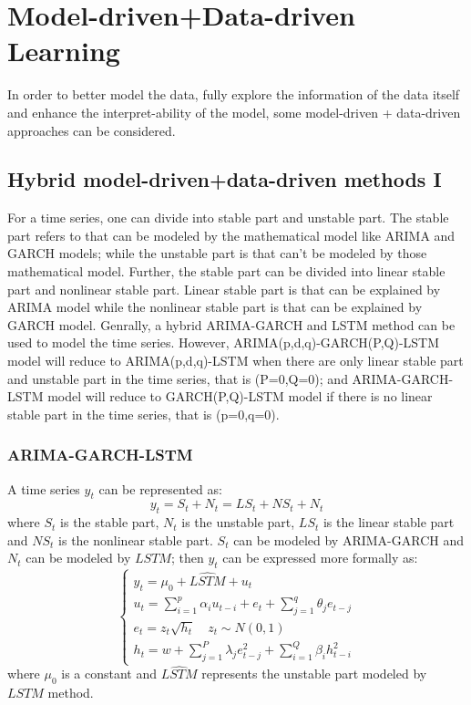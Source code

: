 \section{Model-driven+Data-driven Learning}
\vspace{-0.10in}
In order to better model the data, fully explore the information of the data itself and enhance the interpret-ability of the model, some model-driven + data-driven approaches can be considered.
\subsection{Hybrid model-driven+data-driven methods I}
\vspace{-0.10in}
For a time series, one can divide into stable part and unstable part. The stable part refers to that can be modeled by the mathematical model like ARIMA and GARCH models; while the unstable part is that can't be modeled by those mathematical model. Further, the stable part can be divided into linear stable part and nonlinear stable part. Linear stable part is that can be explained by ARIMA model while the nonlinear stable part is that can be explained by GARCH model. Genrally, a hybrid ARIMA-GARCH and LSTM method can be used to model the  time series. However, ARIMA(p,d,q)-GARCH(P,Q)-LSTM model will reduce to ARIMA(p,d,q)-LSTM when there are only linear stable part and unstable part in the time series, that is (P=0,Q=0); and ARIMA-GARCH-LSTM model will reduce to GARCH(P,Q)-LSTM model if there is no linear stable part in the time series, that is (p=0,q=0).

\subsubsection{ARIMA-GARCH-LSTM}
\vspace{-0.10in}
A time series $y_t$ can be represented as:
\begin{equation}
     y_t = S_t + N_t = LS_t + NS_t + N_t
\end{equation}
where $S_t$ is the  stable part, $N_t$ is the unstable part, $LS_t$ is the linear stable part and $NS_t$ is the nonlinear stable part.  $S_t$ can be modeled by ARIMA-GARCH and $N_t$ can be modeled by $LSTM$; then $y_t$ can be expressed more formally as:
\begin{equation}
\begin{cases}
    y_t = \mu_0 + \widehat{LSTM} + u_t\\
    u_t = \sum_{i=1}^{p} {\alpha_i{u_{t-i}}} + e_t+ \sum_{j=1}^{q} {\theta_j{e_{t-j}}}\\
    e_t = z_t{\sqrt{h_t}} \quad  z_t\sim N(0,1)\\
    h_t = w+\sum_{j=1}^{P}{\lambda_j{e_{t-j}^2}}+\sum_{i=1}^{Q}{\beta_i{h_{t-i}^2}}
\end{cases}
\end{equation}
where $\mu_0$ is a constant and $\widehat{LSTM}$ represents the unstable part modeled by $LSTM$ method. 
                    
